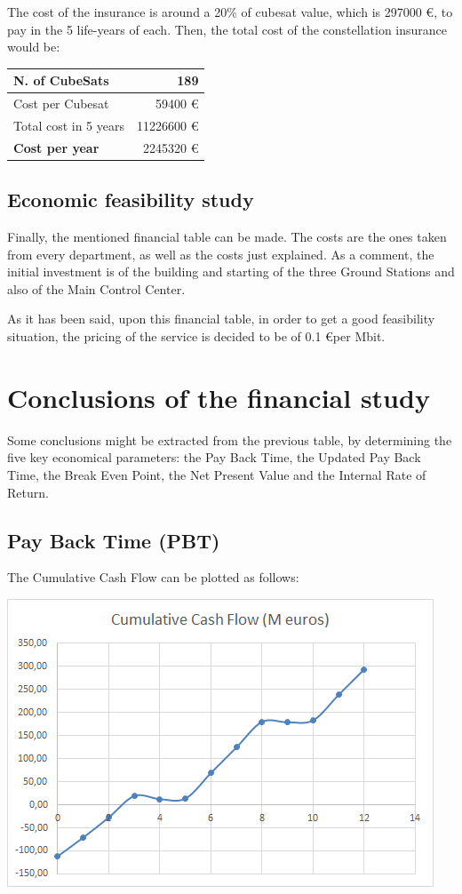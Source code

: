 The cost of the insurance is around a 20\% of cubesat value, which is 297000 \euro, to pay in the 5 life-years of each. Then, the total cost of the constellation insurance would be:

\begin{longtable}{| l | r |}
  \hline
	N. of CubeSats & 189 \\
  \hline
    Cost per Cubesat & 59400 \euro  \\
  \hline
    Total cost in 5 years & 11226600 \euro \\
  \hline
  	\textbf{Cost per year} & 2245320 \euro \\
  \hline

\end{longtable}

\subsection{Economic feasibility study}

Finally, the mentioned financial table can be made. The costs are the ones taken from every department, as well as the costs just explained. As a comment, the initial investment is of the building and starting of the three Ground Stations and also of the Main Control Center.

As it has been said, upon this financial table, in order to get a good feasibility situation, the pricing of the service is decided to be of 0.1 \euro  per Mbit. 




\section{Conclusions of the financial study}
Some conclusions might be extracted from the previous table, by determining the five key economical parameters: the Pay Back Time, the Updated Pay Back Time, the Break Even Point, the Net Present Value and the Internal Rate of Return. 

\subsection{Pay Back Time (PBT)}
The Cumulative Cash Flow can be plotted as follows:

\includegraphics{CCF.png}

